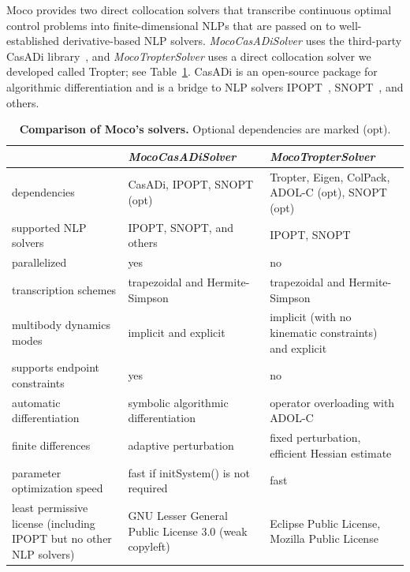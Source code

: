 \documentclass[10pt,letterpaper]{article}
\begin{document}
Moco provides two direct collocation solvers that transcribe continuous optimal control problems into finite-dimensional NLPs that are passed on to well-established derivative-based NLP solvers. \textit{MocoCasADiSolver} uses the third-party CasADi library~\cite{Andersson:2019}, and \textit{MocoTropterSolver} uses a direct collocation solver we developed called Tropter; see Table~\ref{tab:solvers}. CasADi is an open-source package for algorithmic differentiation and is a bridge to NLP solvers IPOPT~\cite{Wachter:2006}, SNOPT~\cite{Gill:2005}, and others.

\begin{table}[!ht]
    \begin{adjustwidth}{-2.25in}{0in} %
        \centering
        \caption{
        {\bf Comparison of Moco’s solvers.} Optional dependencies are marked (opt).}
        \begin{tabular}{p{2.1in}p{2.1in}p{2.1in}}
            \toprule
             & \textbf{\textit{MocoCasADiSolver}} & \textbf{\textit{MocoTropterSolver}} \\ \midrule
            dependencies & CasADi, IPOPT, SNOPT (opt) & Tropter, Eigen, ColPack, ADOL-C (opt), SNOPT (opt) \\ \midrule
            supported NLP solvers & IPOPT, SNOPT, and others & IPOPT, SNOPT \\ \midrule
            parallelized & yes & no \\ \midrule
            transcription schemes & trapezoidal and Hermite-Simpson & trapezoidal and Hermite-Simpson \\ \midrule
            multibody dynamics modes & implicit and explicit & implicit (with no kinematic constraints) and explicit \\ \midrule
            supports endpoint constraints & yes & no \\ \midrule
            automatic differentiation & symbolic algorithmic differentiation & operator overloading with ADOL-C \\ \midrule
            finite differences & adaptive perturbation & fixed perturbation, efficient Hessian estimate~\cite{Bohme:20179} \\ \midrule
            parameter optimization speed & fast if initSystem() is not required & fast \\ \midrule
            least permissive license (including IPOPT but no other NLP solvers) & GNU Lesser General Public License 3.0 (weak copyleft) & Eclipse Public License, Mozilla Public License \\ \bottomrule
        \end{tabular}
        \label{tab:solvers}
    \end{adjustwidth}
\end{table}
\end{document}
